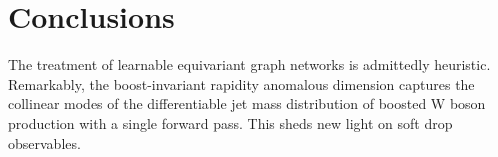 \section{Conclusions}\label{sec:conclusions}

The treatment of learnable equivariant graph networks is admittedly
heuristic. Remarkably, the boost-invariant rapidity anomalous dimension
captures the collinear modes of the differentiable jet mass distribution
of boosted W boson production with a single forward pass. This sheds new
light on soft drop observables.


